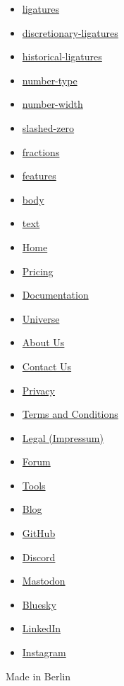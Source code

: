 \begin{itemize}
\begin{itemize}
  \item
    \hyperref[parameters-ligatures]{ligatures}
  \item
    \hyperref[parameters-discretionary-ligatures]{discretionary-ligatures}
  \item
    \hyperref[parameters-historical-ligatures]{historical-ligatures}
  \item
    \hyperref[parameters-number-type]{number-type}
  \item
    \hyperref[parameters-number-width]{number-width}
  \item
    \hyperref[parameters-slashed-zero]{slashed-zero}
  \item
    \hyperref[parameters-fractions]{fractions}
  \item
    \hyperref[parameters-features]{features}
  \item
    \hyperref[parameters-body]{body}
  \item
    \hyperref[parameters-text]{text}
  \end{itemize}
\end{itemize}

\begin{itemize}
\tightlist
\item
  \href{/}{Home}
\item
  \href{/pricing/}{Pricing}
\item
  \href{/docs/}{Documentation}
\item
  \href{/universe/}{Universe}
\item
  \href{/about/}{About Us}
\item
  \href{/contact/}{Contact Us}
\item
  \href{/privacy/}{Privacy}
\item
  \href{https://typst.app/terms}{Terms and Conditions}
\item
  \href{/legal/}{Legal (Impressum)}
\end{itemize}

\begin{itemize}
\tightlist
\item
  \href{https://forum.typst.app}{Forum}
\item
  \href{/tools/}{Tools}
\item
  \href{/blog/}{Blog}
\item
  \href{https://github.com/typst/}{GitHub}
\item
  \href{https://discord.gg/2uDybryKPe}{Discord}
\item
  \href{https://mastodon.social/@typst}{Mastodon}
\item
  \href{https://bsky.app/profile/typst.app}{Bluesky}
\item
  \href{https://www.linkedin.com/company/typst/}{LinkedIn}
\item
  \href{https://instagram.com/typstapp/}{Instagram}
\end{itemize}

Made in Berlin
